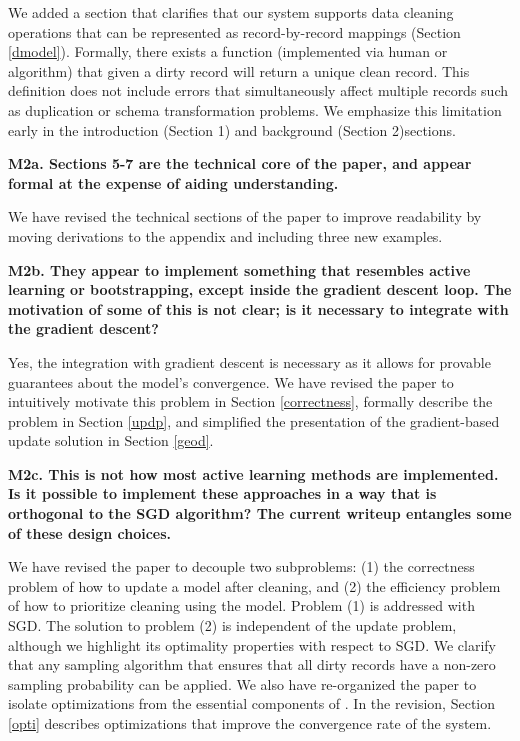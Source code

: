 \vspace{0.5em}

We added a section that clarifies that our system supports data cleaning operations that can be represented as record-by-record mappings (Section \ref{dmodel}).
Formally, there exists a function (implemented via human or algorithm) that given a dirty record will return a unique clean record.
This definition does not include errors that simultaneously affect multiple records such as duplication or schema transformation problems.
We emphasize this limitation early in the introduction (Section 1) and background (Section 2)sections.


\vspace{0.5em}

\noindent\textbf{M2a. Sections 5-7 are the technical core of the paper, and appear formal at the expense of aiding understanding.}

We have revised the technical sections of the paper to improve readability by moving derivations to the appendix and including three new examples.

\vspace{0.5em}

\noindent \textbf{M2b. They appear to implement something that resembles active learning or bootstrapping, except inside the gradient descent loop. The motivation of some of this is not clear; is it necessary to integrate with the gradient descent?} 

Yes, the integration with gradient descent is necessary as it allows for provable guarantees about the model's convergence.
We have revised the paper to intuitively motivate this problem in Section \ref{correctness}, formally describe the problem in Section \ref{updp}, and simplified the presentation of the gradient-based update solution in Section \ref{geod}.

\vspace{0.5em}

\noindent\textbf{M2c. This is not how most active learning methods are implemented. Is it possible to implement these approaches in a way that is orthogonal to the SGD algorithm? The current writeup entangles some of these design choices.} 

We have revised the paper to decouple two subproblems: (1) the correctness problem of how to update a model after cleaning, and (2) the efficiency problem of how to prioritize cleaning using the model. 
Problem (1) is addressed with SGD.
The solution to problem (2) is independent of the update problem, although we highlight its optimality properties with respect to SGD.
We clarify that any sampling algorithm that ensures that all dirty records have a non-zero sampling probability can be applied.
We also have re-organized the paper to isolate optimizations from the essential components of \sys.
In the revision, Section \ref{opti} describes optimizations that improve the convergence rate of the system.

